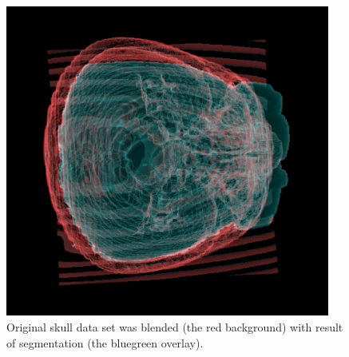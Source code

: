 \begin{figure}
    \centering
    \includegraphics[width=0.95\textwidth]{data/png/merged}
    \caption[3d blending of original and segmentationed images]{
Original skull data set was blended (the red background) with result of segmentation (the bluegreen overlay).
}
    \label{fg:merged}
\end{figure}
